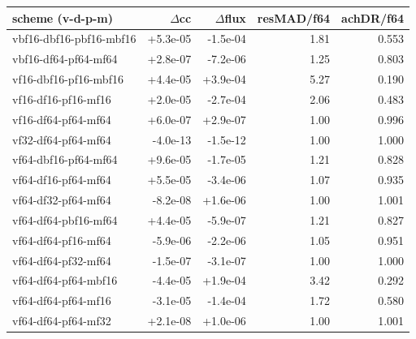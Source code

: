 \begin{tabular}{lrrrr}
\toprule
scheme (v-d-p-m) & $\Delta$cc & $\Delta$flux & resMAD/f64 & achDR/f64 \\
\midrule
vbf16-dbf16-pbf16-mbf16 & +5.3e-05 & -1.5e-04 & 1.81 & 0.553 \\
vbf16-df64-pf64-mf64 & +2.8e-07 & -7.2e-06 & 1.25 & 0.803 \\
vf16-dbf16-pf16-mbf16 & +4.4e-05 & +3.9e-04 & 5.27 & 0.190 \\
vf16-df16-pf16-mf16 & +2.0e-05 & -2.7e-04 & 2.06 & 0.483 \\
vf16-df64-pf64-mf64 & +6.0e-07 & +2.9e-07 & 1.00 & 0.996 \\
vf32-df64-pf64-mf64 & -4.0e-13 & -1.5e-12 & 1.00 & 1.000 \\
vf64-dbf16-pf64-mf64 & +9.6e-05 & -1.7e-05 & 1.21 & 0.828 \\
vf64-df16-pf64-mf64 & +5.5e-05 & -3.4e-06 & 1.07 & 0.935 \\
vf64-df32-pf64-mf64 & -8.2e-08 & +1.6e-06 & 1.00 & 1.001 \\
vf64-df64-pbf16-mf64 & +4.4e-05 & -5.9e-07 & 1.21 & 0.827 \\
vf64-df64-pf16-mf64 & -5.9e-06 & -2.2e-06 & 1.05 & 0.951 \\
vf64-df64-pf32-mf64 & -1.5e-07 & -3.1e-07 & 1.00 & 1.000 \\
vf64-df64-pf64-mbf16 & -4.4e-05 & +1.9e-04 & 3.42 & 0.292 \\
vf64-df64-pf64-mf16 & -3.1e-05 & -1.4e-04 & 1.72 & 0.580 \\
vf64-df64-pf64-mf32 & +2.1e-08 & +1.0e-06 & 1.00 & 1.001 \\
\bottomrule
\end{tabular}